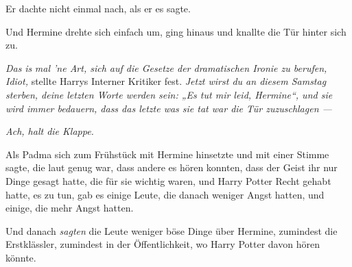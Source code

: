 Er dachte nicht einmal nach, als er es sagte.

Und Hermine drehte sich einfach um, ging hinaus und knallte die Tür hinter sich zu.

\emph{Das} \emph{is} \emph{mal ’ne Art, sich auf die Gesetze der dramatischen Ironie zu berufen, Idiot,} stellte Harrys Interner Kritiker fest. \emph{Jetzt wirst du an diesem Samstag sterben, deine letzten Worte werden sein:
„Es tut mir leid, Hermine“, und sie wird immer bedauern, dass das letzte was sie tat war die Tür zuzuschlagen —}

\emph{Ach, halt die Klappe.}

\later

Als Padma sich zum Frühstück mit Hermine hinsetzte und mit einer Stimme sagte, die laut genug war, dass andere es hören konnten, dass der Geist ihr nur Dinge gesagt hatte, die für sie wichtig waren, und Harry Potter Recht gehabt hatte, es zu tun, gab es einige Leute, die danach weniger Angst hatten, und einige, die mehr Angst hatten.

Und danach \emph{sagten} die Leute weniger böse Dinge über Hermine, zumindest die Erstklässler, zumindest in der Öffentlichkeit, wo Harry Potter davon hören könnte.

